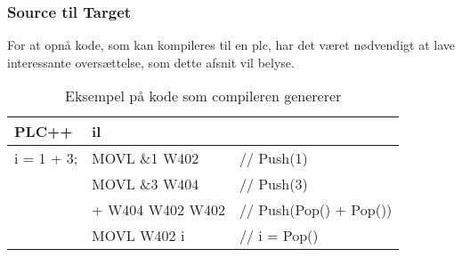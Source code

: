 \subsubsection{Source til Target}
For at opnå kode, som kan kompileres til en \gls{plc}, har det været nødvendigt at lave interessante oversættelse, som dette afsnit vil belyse.

\begin{table}[H]
    \centering\ttfamily
    \begin{tabular}{l|l l}
        PLC++       & \gls{il} \\\hline
        i = 1 + 3;  & MOVL \&1 W402     &// Push(1)\\
                    & MOVL \&3 W404     &// Push(3)\\
                    & + W404 W402 W402  &// Push(Pop() + Pop())\\
                    & MOVL W402 i       &// i = Pop()
    \end{tabular}
    \caption{Eksempel på kode som compileren genererer}
    \label{tab:codegenExample}
\end{table}

